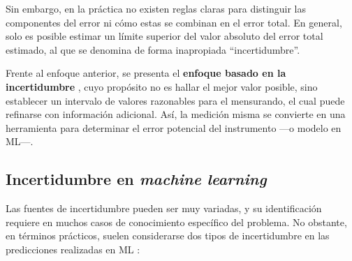 
Sin embargo, en la práctica no existen reglas claras para distinguir las componentes del error ni cómo estas se combinan en el error total. En general, solo es posible estimar un límite superior del valor absoluto del error total estimado, al que se denomina de forma inapropiada ``incertidumbre''. 

Frente al enfoque anterior, se presenta el \textbf{enfoque basado en la incertidumbre} \cite{jcgm100:2008}, cuyo propósito no es hallar el mejor valor posible, sino establecer un intervalo de valores razonables para el mensurando, el cual puede refinarse con información adicional. Así, la medición misma se convierte en una herramienta para determinar el error potencial del instrumento ---o modelo en \acrshort{ML}---. 


\subsection{Incertidumbre en \textit{machine learning}}

Las fuentes de incertidumbre pueden ser muy variadas, y su identificación requiere en muchos casos de 
conocimiento específico del problema. No obstante, en términos prácticos, suelen considerarse dos tipos de 
incertidumbre en las predicciones realizadas en \acrshort{ML} \cite{hullermeier2021, nemani2023}:

